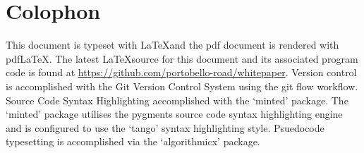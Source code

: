 \chapter*{Colophon}

This document is typeset with \LaTeX and the pdf document is rendered with pdf\LaTeX.
The latest \LaTeX source for this document and its associated program code is
found at \url{https://github.com/portobello-road/whitepaper}. Version control
is accomplished with the Git Version Control System using the git flow workflow.
Source Code Syntax Highlighting accomplished with the `minted' package. The `minted'
package utilises the pygments source code syntax highlighting engine and is configured
to use the `tango' syntax highlighting style. Psuedocode typesetting is
accomplished via the `algorithmicx' package.
